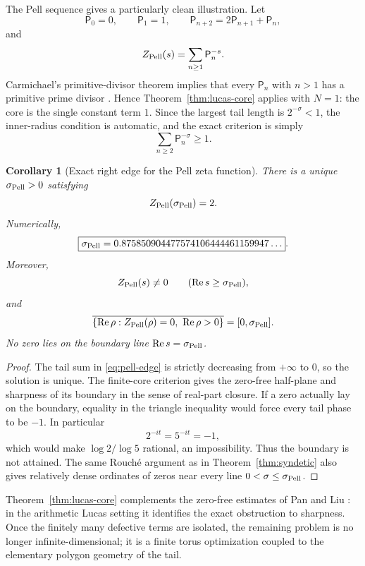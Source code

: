\documentclass[11pt]{article}
\newtheorem{corollary}[theorem]{Corollary}
\theoremstyle{remark}
\newcommand{\Ree}{\operatorname{Re}}
\begin{document}
The Pell sequence gives a particularly clean illustration.  Let
\[
\mathsf P_0=0,\qquad \mathsf P_1=1,\qquad
\mathsf P_{n+2}=2\mathsf P_{n+1}+\mathsf P_n,
\]
and
\[
Z_{\rm Pell}(s)=\sum_{n\ge1}\mathsf P_n^{-s}.
\]
Carmichael's primitive-divisor theorem implies that every $\mathsf P_n$ with $n>1$ has a primitive prime divisor \cite{Carmichael1913}.  Hence Theorem~\ref{thm:lucas-core} applies with $N=1$: the core is the single constant term $1$.  Since the largest tail length is $2^{-\sigma}<1$, the inner-radius condition is automatic, and the exact criterion is simply
\[
\sum_{n\ge2}\mathsf P_n^{-\sigma}\ge1.
\]

\begin{corollary}[Exact right edge for the Pell zeta function]\label{cor:pell}
There is a unique $\sigma_{\rm Pell}>0$ satisfying
\begin{equation}\label{eq:pell-edge}
Z_{\rm Pell}(\sigma_{\rm Pell})=2.
\end{equation}
Numerically,
\[
\boxed{\sigma_{\rm Pell}=0.875850904477574106444461159947\ldots}.
\]
Moreover,
\[
Z_{\rm Pell}(s)\ne0\qquad(\Ree s\ge\sigma_{\rm Pell}),
\]
and
\[
\overline{\{\Ree\rho:Z_{\rm Pell}(\rho)=0,\ \Ree\rho>0\}}
=[0,\sigma_{\rm Pell}].
\]
No zero lies on the boundary line $\Ree s=\sigma_{\rm Pell}$.
\end{corollary}

\begin{proof}
The tail sum in \eqref{eq:pell-edge} is strictly decreasing from $+\infty$ to $0$, so the solution is unique.  The finite-core criterion gives the zero-free half-plane and sharpness of its boundary in the sense of real-part closure.  If a zero actually lay on the boundary, equality in the triangle inequality would force every tail phase to be $-1$.  In particular
\[
2^{-it}=5^{-it}=-1,
\]
which would make $\log2/\log5$ rational, an impossibility.  Thus the boundary is not attained.  The same Rouch\'e argument as in Theorem~\ref{thm:syndetic} also gives relatively dense ordinates of zeros near every line $0<\sigma\le\sigma_{\rm Pell}$.
\end{proof}

Theorem~\ref{thm:lucas-core} complements the zero-free estimates of Pan and Liu \cite{PanLiu2026}: in the arithmetic Lucas setting it identifies the exact obstruction to sharpness.  Once the finitely many defective terms are isolated, the remaining problem is no longer infinite-dimensional; it is a finite torus optimization coupled to the elementary polygon geometry of the tail.
\end{document}
